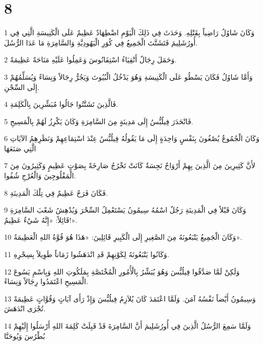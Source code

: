 \chapter{8}

\par 1 وَكَانَ شَاوُلُ رَاضِياً بِقَتْلِهِ. وَحَدَثَ فِي ذَلِكَ الْيَوْمِ اضْطِهَادٌ عَظِيمٌ عَلَى الْكَنِيسَةِ الَّتِي فِي أُورُشَلِيمَ فَتَشَتَّتَ الْجَمِيعُ فِي كُوَرِ الْيَهُودِيَّةِ وَالسَّامِرَةِ مَا عَدَا الرُّسُلَ.
\par 2 وَحَمَلَ رِجَالٌ أَتْقِيَاءُ اسْتِفَانُوسَ وَعَمِلُوا عَلَيْهِ مَنَاحَةً عَظِيمَةً.
\par 3 وَأَمَّا شَاوُلُ فَكَانَ يَسْطُو عَلَى الْكَنِيسَةِ وَهُوَ يَدْخُلُ الْبُيُوتَ وَيَجُرُّ رِجَالاً وَنِسَاءً وَيُسَلِّمُهُمْ إِلَى السِّجْنِ.
\par 4 فَالَّذِينَ تَشَتَّتُوا جَالُوا مُبَشِّرِينَ بِالْكَلِمَةِ.
\par 5 فَانْحَدَرَ فِيلُبُّسُ إِلَى مَدِينَةٍ مِنَ السَّامِرَةِ وَكَانَ يَكْرِزُ لَهُمْ بِالْمَسِيحِ.
\par 6 وَكَانَ الْجُمُوعُ يُصْغُونَ بِنَفْسٍ وَاحِدَةٍ إِلَى مَا يَقُولُهُ فِيلُبُّسُ عِنْدَ اسْتِمَاعِهِمْ وَنَظَرِهِمُ الآيَاتِ الَّتِي صَنَعَهَا
\par 7 لأَنَّ كَثِيرِينَ مِنَ الَّذِينَ بِهِمْ أَرْوَاحٌ نَجِسَةٌ كَانَتْ تَخْرُجُ صَارِخَةً بِصَوْتٍ عَظِيمٍ وَكَثِيرُونَ مِنَ الْمَفْلُوجِينَ وَالْعُرْجِ شُفُوا.
\par 8 فَكَانَ فَرَحٌ عَظِيمٌ فِي تِلْكَ الْمَدِينَةِ.
\par 9 وَكَانَ قَبْلاً فِي الْمَدِينَةِ رَجُلٌ اسْمُهُ سِيمُونُ يَسْتَعْمِلُ السِّحْرَ وَيُدْهِشُ شَعْبَ السَّامِرَةِ قَائِلاً: «إِنَّهُ شَيْءٌ عَظِيمٌ!».
\par 10 وَكَانَ الْجَمِيعُ يَتْبَعُونَهُ مِنَ الصَّغِيرِ إِلَى الْكَبِيرِ قَائِلِينَ: «هَذَا هُوَ قُوَّةُ اللهِ الْعَظِيمَةُ».
\par 11 وَكَانُوا يَتْبَعُونَهُ لِكَوْنِهِمْ قَدِ انْدَهَشُوا زَمَاناً طَوِيلاً بِسِحْرِهِ.
\par 12 وَلَكِنْ لَمَّا صَدَّقُوا فِيلُبُّسَ وَهُوَ يُبَشِّرُ بِالْأُمُورِ الْمُخْتَصَّةِ بِمَلَكُوتِ اللهِ وَبِاسْمِ يَسُوعَ الْمَسِيحِ اعْتَمَدُوا رِجَالاً وَنِسَاءً.
\par 13 وَسِيمُونُ أَيْضاً نَفْسُهُ آمَنَ. وَلَمَّا اعْتَمَدَ كَانَ يُلاَزِمُ فِيلُبُّسَ وَإِذْ رَأَى آيَاتٍ وَقُوَّاتٍ عَظِيمَةً تُجْرَى انْدَهَشَ.
\par 14 وَلَمَّا سَمِعَ الرُّسُلُ الَّذِينَ فِي أُورُشَلِيمَ أَنَّ السَّامِرَةَ قَدْ قَبِلَتْ كَلِمَةَ اللهِ أَرْسَلُوا إِلَيْهِمْ بُطْرُسَ وَيُوحَنَّا
